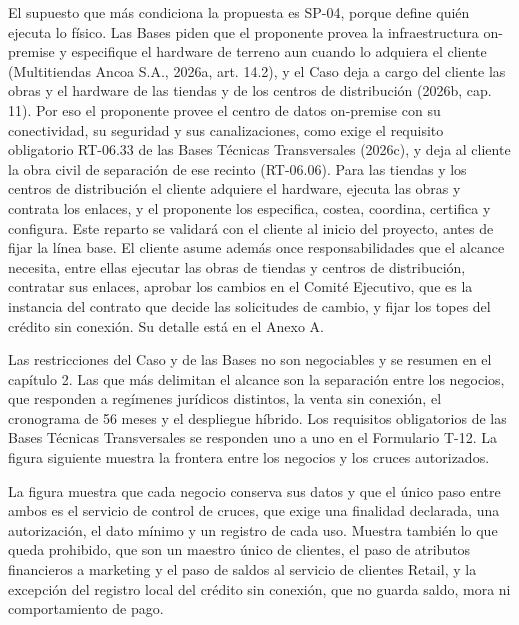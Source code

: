 \documentclass[11pt]{article}
\begin{document}
El supuesto que más condiciona la propuesta es SP-04, porque define quién ejecuta lo físico. Las Bases piden que el proponente provea la infraestructura on-premise y especifique el hardware de terreno aun cuando lo adquiera el cliente (Multitiendas Ancoa S.A., 2026a, art. 14.2), y el Caso deja a cargo del cliente las obras y el hardware de las tiendas y de los centros de distribución (2026b, cap. 11). Por eso el proponente provee el centro de datos on-premise con su conectividad, su seguridad y sus canalizaciones, como exige el requisito obligatorio RT-06.33 de las Bases Técnicas Transversales (2026c), y deja al cliente la obra civil de separación de ese recinto (RT-06.06). Para las tiendas y los centros de distribución el cliente adquiere el hardware, ejecuta las obras y contrata los enlaces, y el proponente los especifica, costea, coordina, certifica y configura. Este reparto se validará con el cliente al inicio del proyecto, antes de fijar la línea base. El cliente asume además once responsabilidades que el alcance necesita, entre ellas ejecutar las obras de tiendas y centros de distribución, contratar sus enlaces, aprobar los cambios en el Comité Ejecutivo, que es la instancia del contrato que decide las solicitudes de cambio, y fijar los topes del crédito sin conexión. Su detalle está en el Anexo A.

Las restricciones del Caso y de las Bases no son negociables y se resumen en el capítulo 2. Las que más delimitan el alcance son la separación entre los negocios, que responden a regímenes jurídicos distintos, la venta sin conexión, el cronograma de 56 meses y el despliegue híbrido. Los requisitos obligatorios de las Bases Técnicas Transversales se responden uno a uno en el Formulario T-12. La figura siguiente muestra la frontera entre los negocios y los cruces autorizados.


La figura muestra que cada negocio conserva sus datos y que el único paso entre ambos es el servicio de control de cruces, que exige una finalidad declarada, una autorización, el dato mínimo y un registro de cada uso. Muestra también lo que queda prohibido, que son un maestro único de clientes, el paso de atributos financieros a marketing y el paso de saldos al servicio de clientes Retail, y la excepción del registro local del crédito sin conexión, que no guarda saldo, mora ni comportamiento de pago.
\end{document}
